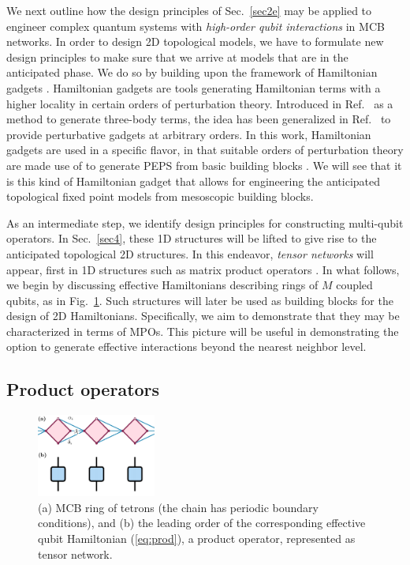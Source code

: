 \documentclass[twocolumn,floats,prx,showpacs]{revtex4-1}
\begin{document}
We next outline  how the  design principles of Sec.~\ref{sec2e} may be applied to engineer complex quantum systems with \emph{high-order qubit interactions} in MCB networks. 
In order to design 2D topological models, we have to formulate new
design principles to make sure that we arrive at models that are in the anticipated phase. We do so by building upon the 
framework of Hamiltonian gadgets 
\cite{Kempe-SIAM-2006,PhysRevA.77.062329,Brell2014PEPS,Bartlett06}. Hamiltonian gadgets
are tools generating Hamiltonian terms with a higher locality in certain orders of perturbation theory. Introduced
in Ref.\ \cite{Kempe-SIAM-2006} as a method to generate three-body terms, the idea has been generalized in Ref.\
\cite{PhysRevA.77.062329} to provide perturbative gadgets at arbitrary orders. In this work, Hamiltonian gadgets are used in a 
specific flavor, in that suitable orders of perturbation theory are made use of to generate PEPS from basic building blocks
\cite{Brell2014PEPS,Bartlett06}. We will see that it is this kind of Hamiltonian gadget that allows for engineering 
the anticipated topological fixed point models from mesoscopic building blocks.


As an intermediate step, we 
identify design principles for constructing multi-qubit operators. In Sec.\ \ref{sec4}, these 1D
structures will be lifted to give rise to the anticipated topological 2D structures. In this endeavor, \emph{tensor networks} \cite{Orus-AnnPhys-2014,AreaReview,VerstraeteBig,SchuchReview}
will appear, first in 1D structures such as matrix product operators 
\cite{Mixed,1367-2630-12-2-025012,raey,MPO_Representations,UndecidableMPO,Bultinck2017}.
In what follows,
we begin by discussing effective Hamiltonians describing  rings of $M$ coupled qubits,   as  in Fig.~\ref{fig:tetron_prod}. Such structures will later be used as building blocks for the design of 2D Hamiltonians. Specifically, we aim to demonstrate that they may be characterized in terms of MPOs. This picture will be useful in  demonstrating the option to generate effective interactions beyond the nearest neighbor level.  

\subsection{Product operators}\label{sec3a}

\begin{figure}
\includegraphics[width=0.35\textwidth]{fig/tetron_prod.pdf}
\caption{(a) MCB ring of tetrons (the chain has periodic boundary conditions), and (b) the leading order of the corresponding effective qubit Hamiltonian (\ref{eq:prod}), a product operator, represented as tensor network.}
\label{fig:tetron_prod}
\end{figure}
\end{document}

